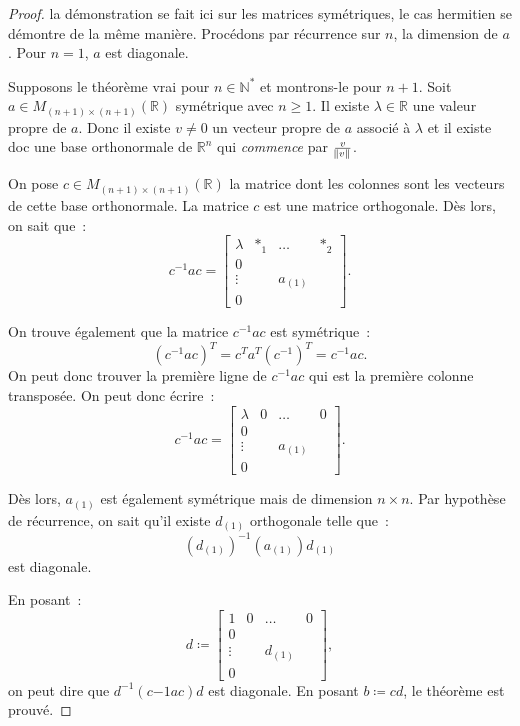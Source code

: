 \documentclass{article}
\newcommand{\N}{\mathbb N}
\newcommand{\R}{\mathbb R}
\newcommand{\M}[3]{M_{#1 \times #2}(#3)}
\theoremstyle{definition}
\theoremstyle{remark}
\begin{document}
		\begin{proof} la démonstration se fait ici sur les matrices symétriques, le cas hermitien se démontre de la même manière. Procédons par récurrence sur
		$n$, la dimension de $a$. Pour $n=1$, $a$ est diagonale.

		Supposons le théorème vrai pour $n \in \N^*$ et montrons-le pour $n+1$. Soit $a \in \M {(n+1)}{(n+1)}\R$ symétrique avec $n \geq 1$. Il existe
		$\lambda \in \R$ une valeur propre de $a$. Donc il existe $v \neq 0$ un vecteur propre de $a$ associé à $\lambda$ et il existe doc une base
		orthonormale de $\R^n$ qui \emph{commence} par $\frac v{\norm v}$.

		On pose $c \in \M {(n+1)}{(n+1)}\R$ la matrice dont les colonnes sont les vecteurs de cette base orthonormale. La matrice $c$ est une matrice
		orthogonale. Dès lors, on sait que~:
		\[c^{-1}ac =
		\begin{bmatrix}
			\lambda & *_1 & \ldots & *_2 \\
			0 \\
			\vdots & & a_{(1)}\\
			0
		\end{bmatrix}.\]

		On trouve également que la matrice $c^{-1}ac$ est symétrique~:
		\[\left(c^{-1}ac\right)^T = c^Ta^T(c^{-1})^T = c^{-1}ac.\]
		On peut donc trouver la première ligne de $c^{-1}ac$ qui est la première colonne transposée. On peut donc écrire~:
		\[c^{-1}ac =
		\begin{bmatrix}
			\lambda & 0 & \ldots & 0 \\
			0 \\
			\vdots & & a_{(1)}\\
			0
		\end{bmatrix}.\]

		Dès lors, $a_{(1)}$ est également symétrique mais de dimension $n \times n$. Par hypothèse de récurrence, on sait qu'il existe $d_{(1)}$ orthogonale
		telle que~:
		\[(d_{(1)})^{-1}(a_{(1)})d_{(1)}\]
		est diagonale.

		En posant~:
		\[d \coloneqq
		\begin{bmatrix}
			  1    & 0 & \ldots & 0 \\
			  0    \\
			\vdots &   &  d_{(1)} \\
			  0
		\end{bmatrix},\]
		on peut dire que $d^{-1}\left(c{-1}ac\right)d$ est diagonale. En posant $b \coloneqq cd$, le théorème est prouvé.
		\end{proof}
\end{document}
